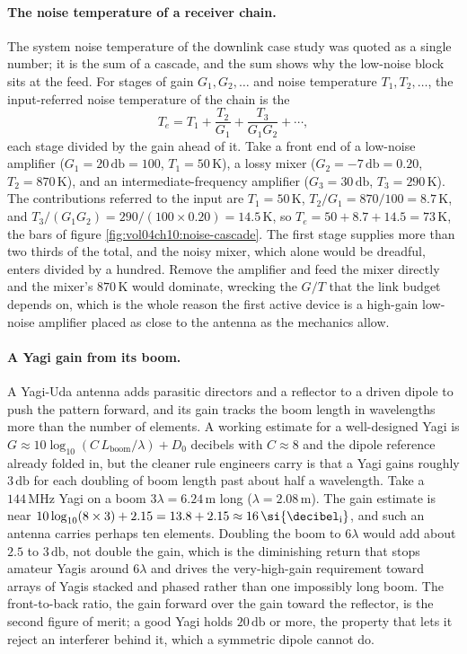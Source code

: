 \paragraph{The noise temperature of a receiver chain.}
The system noise temperature of the downlink case study was quoted as a
single number; it is the sum of a cascade, and the sum shows why the
low-noise block sits at the feed. For stages of gain $G_1, G_2, \dots$ and
noise temperature $T_1, T_2, \dots$, the input-referred noise temperature
of the chain is the 
\[
T_e = T_1 + \frac{T_2}{G_1} + \frac{T_3}{G_1 G_2} + \cdots,
\]
each stage divided by the gain ahead of it. Take a front end of a
low-noise amplifier ($G_1 = 20\,\si{\decibel} = 100$, $T_1 = 50\,\si{
\kelvin}$), a lossy mixer ($G_2 = -7\,\si{\decibel} = 0.20$, $T_2 =
870\,\si{\kelvin}$), and an intermediate-frequency amplifier ($G_3 = 30\,\si{
\decibel}$, $T_3 = 290\,\si{\kelvin}$). The contributions referred to the
input are $T_1 = 50\,\si{\kelvin}$, $T_2/G_1 = 870/100 = 8.7\,\si{\kelvin}$,
and $T_3/(G_1 G_2) = 290/(100\times 0.20) = 14.5\,\si{\kelvin}$, so $T_e =
50 + 8.7 + 14.5 = 73\,\si{\kelvin}$, the bars of figure
\ref{fig:vol04ch10:noise-cascade}. The first stage supplies more than two
thirds of the total, and the noisy mixer, which alone would be dreadful,
enters divided by a hundred. Remove the amplifier and feed the mixer
directly and the mixer's $870\,\si{\kelvin}$ would dominate, wrecking the
$G/T$ that the link budget depends on, which is the whole reason the
first active device is a high-gain low-noise amplifier placed as close to
the antenna as the mechanics allow.



\paragraph{A Yagi gain from its boom.}
A Yagi-Uda antenna adds parasitic directors and a reflector to a driven
dipole to push the pattern forward, and its gain tracks the boom length in
wavelengths more than the number of elements. A working estimate for a
well-designed Yagi is $G\approx 10\log_{10}(C\,L_{\text{boom}}/\lambda) +
D_0$ decibels with $C\approx 8$ and the dipole reference already folded in,
but the cleaner rule engineers carry is that a Yagi gains roughly
$3\,\si{\decibel}$ for each doubling of boom length past about half a
wavelength. Take a $144\,\si{\mega\hertz}$ Yagi on a boom
$3\lambda = 6.24\,\si{\meter}$ long ($\lambda = 2.08\,\si{\meter}$). The
gain estimate is near $10\log_{10}(8\times 3) + 2.15 = 13.8 + 2.15 \approx
16\,\si{\decibel\textsubscript{i}}$, and such an antenna carries perhaps
ten elements. Doubling the boom to $6\lambda$ would add about $2.5$ to
$3\,\si{\decibel}$, not double the gain, which is the diminishing return
that stops amateur Yagis around $6\lambda$ and drives the very-high-gain
requirement toward arrays of Yagis stacked and phased rather than one
impossibly long boom. The front-to-back ratio, the gain forward over the
gain toward the reflector, is the second figure of merit; a good Yagi holds
$20\,\si{\decibel}$ or more, the property that lets it reject an
interferer behind it, which a symmetric dipole cannot do.

